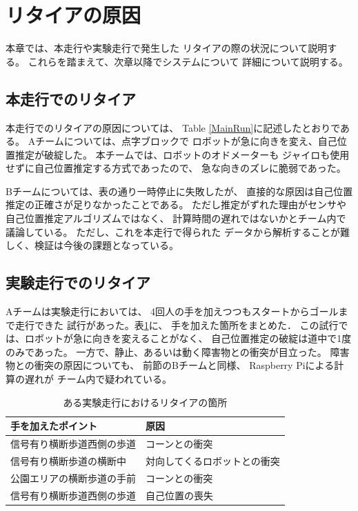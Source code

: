 \documentclass[twocolumn,9pt]{jsproceedings}
\begin{document}

\section{リタイアの原因}

本章では、本走行や実験走行で発生した
リタイアの際の状況について説明する。
これらを踏まえて、次章以降でシステムについて
詳細について説明する。

\subsection{本走行でのリタイア}\label{sub:retire}


本走行でのリタイアの原因については、
Table \ref{MainRun}に記述したとおりである。
Aチームについては、点字ブロックで
ロボットが急に向きを変え、自己位置推定が破綻した。
本チームでは、ロボットのオドメーターも
ジャイロも使用せずに自己位置推定する方式であったので、
急な向きのズレに脆弱であった。

Bチームについては、表の通り一時停止に失敗したが、
直接的な原因は自己位置推定の正確さが足りなかったことである。
ただし推定がずれた理由がセンサや自己位置推定アルゴリズムではなく、
計算時間の遅れではないかとチーム内で議論している。
ただし、これを本走行で得られた
データから解析することが難しく、検証は今後の課題となっている。

\subsection{実験走行でのリタイア}


Aチームは実験走行においては、
4回人の手を加えつつもスタートからゴールまで走行できた
試行があった。表\ref{4hands}に、
手を加えた箇所をまとめた．
この試行では、ロボットが急に向きを変えることがなく、
自己位置推定の破綻は道中で1度のみであった。
一方で、静止、あるいは動く障害物との衝突が目立った。
障害物との衝突の原因についても、
前節のBチームと同様、
Raspberry Piによる計算の遅れが
チーム内で疑われている。

\begin{table}[h]
  \caption{ある実験走行におけるリタイアの箇所}
  \label{4hands}
	\begin{tabular}{|l|p{3.5cm}|}
    \hline
    手を加えたポイント & 原因 \\
    \hline
    信号有り横断歩道西側の歩道 & コーンとの衝突 \\
    \hline
    信号有り横断歩道の横断中 & 対向してくるロボットとの衝突 \\ 
    \hline
    公園エリアの横断歩道の手前 & コーンとの衝突 \\ 
    \hline
    信号有り横断歩道西側の歩道 & 自己位置の喪失 \\ 
    \hline
  \end{tabular}
\end{table}
\end{document}
